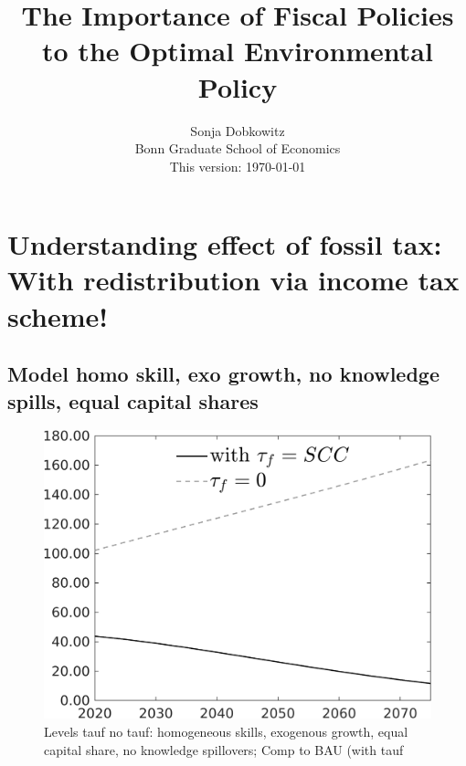 \documentclass[12pt]{article}
\title{The Importance of Fiscal Policies to the Optimal Environmental Policy}
\date{Sonja Dobkowitz\\ Bonn Graduate School of Economics\\ %
	\vspace{1mm}
	This version: \today }
\begin{document}
\section{Understanding effect of fossil tax: With redistribution via income tax scheme!}
\subsection{Model homo skill, exo growth, no knowledge spills, equal capital shares}
\begin{figure}[h!!]
\centering
\caption{Levels tauf no tauf: homogeneous skills, exogenous growth, equal capital share, no knowledge spillovers; Comp to BAU (with tauf}\label{fig:Leveltauf_nsk1_xgr1_equalcapShare_noknow_withtaul}
\begin{minipage}[]{0.32\textwidth}
	\includegraphics[width=1\textwidth]{../../codding_model/own_basedOnFried/optimalPol_010922_revision/figures/all_13Sept22/LevTaufNoTauf_TaulCalib_Equlab_regime0_Emnet_spillover0_nsk1_xgr1_knspil1_sep1_LFlimit0_emsbase0_countec0_GovRev0_etaa0.79_lgd1.png}
\end{minipage}	
\begin{minipage}[]{0.32\textwidth}

\end{minipage}
\end{figure}
\end{document}
